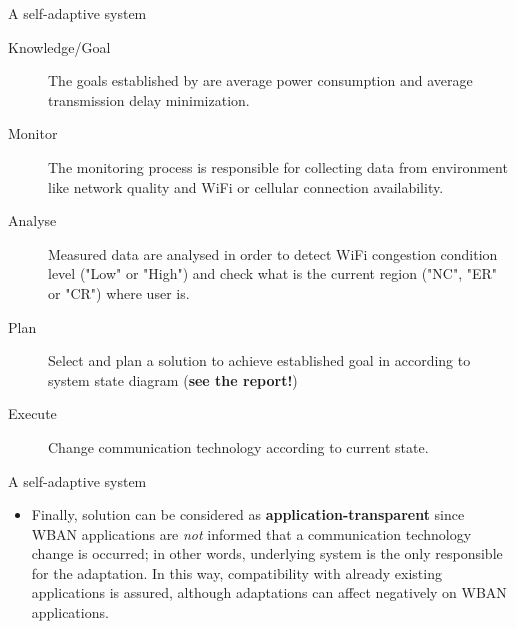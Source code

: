 \documentclass[10pt]{beamer}
\begin{document}
\begin{frame}{A self-adaptive system} 

\begin{description}

\item[Knowledge/Goal] The goals established by \citet{MSAReport} are average power consumption and average transmission delay minimization.

\item[Monitor] The monitoring process is responsible for collecting data from environment like network quality and WiFi or cellular connection availability. 

\item[Analyse] Measured data are analysed in order to detect WiFi congestion condition level ("Low" or "High") and check what is the current region ("NC", "ER" or "CR") where user is.

\item[Plan] Select and plan a solution to achieve established goal in according to system state diagram (\textbf{see the report!})

\item[Execute] Change communication technology according to current state.

\end{description}

\end{frame} 
\begin{frame}{A self-adaptive system} 

\begin{itemize}

\item Finally, \citet{MSAReport} solution can be considered as \textbf{application-transparent} since WBAN applications are \textit{not} informed that a communication technology change is occurred; in other words, underlying system is the only responsible for the adaptation. In this way, compatibility with already existing applications is assured, although adaptations can affect negatively on WBAN applications. 

\end{itemize}


\end{frame} 
\end{document}
